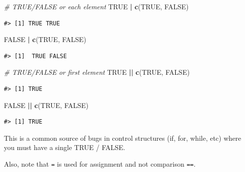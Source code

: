\documentclass[]{book}
\newenvironment{Shaded}{\begin{snugshade}}{\end{snugshade}}
\newcommand{\KeywordTok}[1]{\textcolor[rgb]{0.13,0.29,0.53}{\textbf{#1}}}
\newcommand{\StringTok}[1]{\textcolor[rgb]{0.31,0.60,0.02}{#1}}
\newcommand{\CommentTok}[1]{\textcolor[rgb]{0.56,0.35,0.01}{\textit{#1}}}
\newcommand{\OtherTok}[1]{\textcolor[rgb]{0.56,0.35,0.01}{#1}}
\newcommand{\OperatorTok}[1]{\textcolor[rgb]{0.81,0.36,0.00}{\textbf{#1}}}
\newcommand{\NormalTok}[1]{#1}
\theoremstyle{definition}
\theoremstyle{definition}
\theoremstyle{definition}
\theoremstyle{remark}
\begin{document}
\begin{Shaded}
\begin{Highlighting}[]
\CommentTok{# TRUE/FALSE or each element}
\OtherTok{TRUE} \OperatorTok{|}\StringTok{ }\KeywordTok{c}\NormalTok{(}\OtherTok{TRUE}\NormalTok{, }\OtherTok{FALSE}\NormalTok{)}
\end{Highlighting}
\end{Shaded}

\begin{verbatim}
#> [1] TRUE TRUE
\end{verbatim}

\begin{Shaded}
\begin{Highlighting}[]
\OtherTok{FALSE} \OperatorTok{|}\StringTok{ }\KeywordTok{c}\NormalTok{(}\OtherTok{TRUE}\NormalTok{, }\OtherTok{FALSE}\NormalTok{)}
\end{Highlighting}
\end{Shaded}

\begin{verbatim}
#> [1]  TRUE FALSE
\end{verbatim}

\begin{Shaded}
\begin{Highlighting}[]
\CommentTok{# TRUE/FALSE or first element}
\OtherTok{TRUE} \OperatorTok{||}\StringTok{ }\KeywordTok{c}\NormalTok{(}\OtherTok{TRUE}\NormalTok{, }\OtherTok{FALSE}\NormalTok{)}
\end{Highlighting}
\end{Shaded}

\begin{verbatim}
#> [1] TRUE
\end{verbatim}

\begin{Shaded}
\begin{Highlighting}[]
\OtherTok{FALSE} \OperatorTok{||}\StringTok{ }\KeywordTok{c}\NormalTok{(}\OtherTok{TRUE}\NormalTok{, }\OtherTok{FALSE}\NormalTok{)}
\end{Highlighting}
\end{Shaded}

\begin{verbatim}
#> [1] TRUE
\end{verbatim}

This is a common source of bugs in control structures (if, for, while,
etc) where you must have a single TRUE / FALSE.

Also, note that \texttt{=} is used for assignment and not comparison
\texttt{==}.
\end{document}
